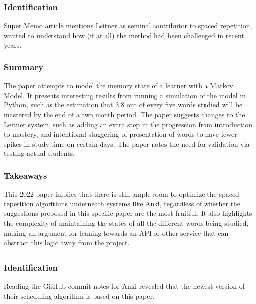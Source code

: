 \documentclass[
	letterpaper, %
]{jdf}
\begin{document}
\subsubsection{Identification}
Super Memo article mentions Leitner as seminal contributor to spaced repetition, wanted to understand how (if at all) the method had been challenged in recent years.

\subsubsection{Summary}
The paper attempts to model the memory state of a learner with a Markov Model. It presents interesting results from running a simulation of the model in Python, such as the estimation that 3.8 out of every five words studied will be mastered by the end of a two month period. The paper suggests changes to the Leitner system, such as adding an extra step in the progression from introduction to mastery, and intentional staggering of presentation of words to have fewer spikes in study time on certain days. The paper notes the need for validation via testing actual students.

\subsubsection{Takeaways}
This 2022 paper implies that there is still ample room to optimize the spaced repetition algorithms underneath systems like Anki, regardless of whether the suggestions proposed in this specific paper are the most fruitful. It also highlights the complexity of maintaining the states of all the different words being studied, making an argument for leaning towards an API or other service that can abstract this logic away from the project.

\subsection{}
\subsubsection{Identification}
Reading the GitHub commit notes for Anki revealed that the newest version of their scheduling algorithm is based on this paper.
\end{document}
